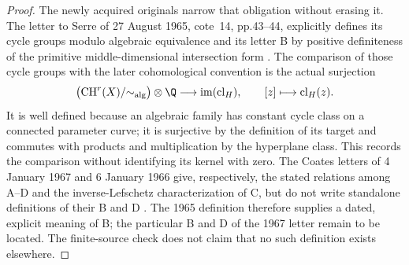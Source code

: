 \begin{proof}
The newly acquired originals narrow that obligation without
erasing it. The letter to Serre of 27 August 1965, cote~14,
pp.43--44, explicitly defines its cycle groups modulo
algebraic equivalence and its letter B by positive
definiteness of the primitive middle-dimensional intersection
form \cite{AuditGrothendieckSerre1965}. The comparison of
those cycle groups with the later cohomological convention
is the actual surjection
\[
 \bigl(\operatorname{CH}^r(X)/{\sim_{\rm alg}}\bigr)\otimes\Q
 \longrightarrow \operatorname{im}(\operatorname{cl}_H),
 \qquad [z]\longmapsto\operatorname{cl}_H(z).
\]
It is well defined because an algebraic family has constant
cycle class on a connected parameter curve; it is surjective
by the definition of its target and commutes with products
and multiplication by the hyperplane class. This records
the comparison without identifying its kernel with zero.
The Coates letters of 4 January 1967 and 6 January 1966
give, respectively, the stated relations among A--D and
the inverse-Lefschetz characterization of C, but do not
write standalone definitions of their B and D
\cite[pp.1--3]{AuditGrothendieckCoates1967}
\cite[p.1]{AuditGrothendieckCoates1966}.
The 1965 definition therefore supplies a dated, explicit
meaning of B; the particular B and D of the 1967 letter
remain to be located. The finite-source check does not
claim that no such definition exists elsewhere.
\end{proof}

